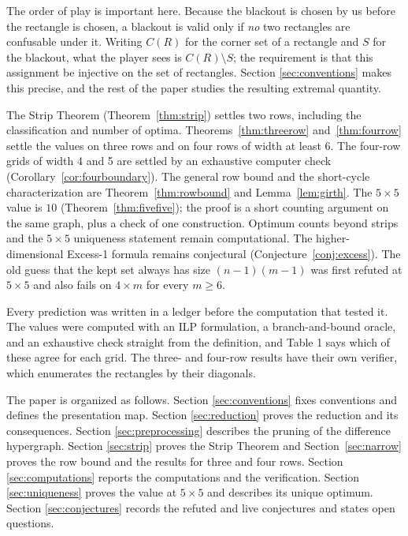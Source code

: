 \documentclass[12pt]{article}
\theoremstyle{definition}\newtheorem{definition}{Definition}
\theoremstyle{remark}\newtheorem{remark}{Remark}
\begin{document}
The order of play is important here. Because the blackout is chosen by us
before the rectangle is chosen, a blackout is valid only if \emph{no} two
rectangles are confusable under it. Writing $C(R)$ for the corner set of a rectangle
and $S$ for the blackout, what the player sees is $C(R) \setminus S$; the requirement
is that this assignment be injective on the set of rectangles. Section
\ref{sec:conventions} makes this precise, and the rest of the paper studies the
resulting extremal quantity.

The Strip Theorem (Theorem~\ref{thm:strip}) settles two rows, including the
classification and number of optima. Theorems~\ref{thm:threerow}
and~\ref{thm:fourrow} settle the values on three rows and on four rows of
width at least 6. The four-row grids of width 4 and 5 are settled by an
exhaustive computer check (Corollary~\ref{cor:fourboundary}). The general row
bound and the short-cycle characterization are Theorem~\ref{thm:rowbound} and
Lemma~\ref{lem:girth}.
The $5\times5$ value is $10$ (Theorem~\ref{thm:fivefive}); the
proof is a short counting argument on the same graph, plus a check of one
construction. Optimum counts beyond strips and the $5\times5$ uniqueness statement remain
computational. The higher-dimensional Excess-1 formula remains conjectural
(Conjecture~\ref{conj:excess}). The old guess that the kept set always has size
$(n-1)(m-1)$ was first refuted at $5\times5$ and also fails on $4\times m$
for every $m\ge6$.

Every prediction was written in a ledger before the computation that tested it. The
values were computed with an ILP formulation, a branch-and-bound oracle, and an
exhaustive check straight from the definition, and Table 1 says which of these agree
for each grid. The three- and four-row results have their own verifier, which
enumerates the rectangles by their diagonals.

The paper is organized as follows. Section \ref{sec:conventions} fixes conventions and
defines the presentation map. Section \ref{sec:reduction} proves the reduction and its
consequences. Section \ref{sec:preprocessing} describes the pruning of the difference
hypergraph. Section \ref{sec:strip} proves the Strip Theorem and Section~\ref{sec:narrow}
proves the row bound and the results for three and four rows. Section
\ref{sec:computations} reports the computations and the verification. Section
\ref{sec:uniqueness} proves the value at $5 \times 5$ and describes its unique optimum. Section \ref{sec:conjectures}
records the refuted and live conjectures and states open questions.
\end{document}
